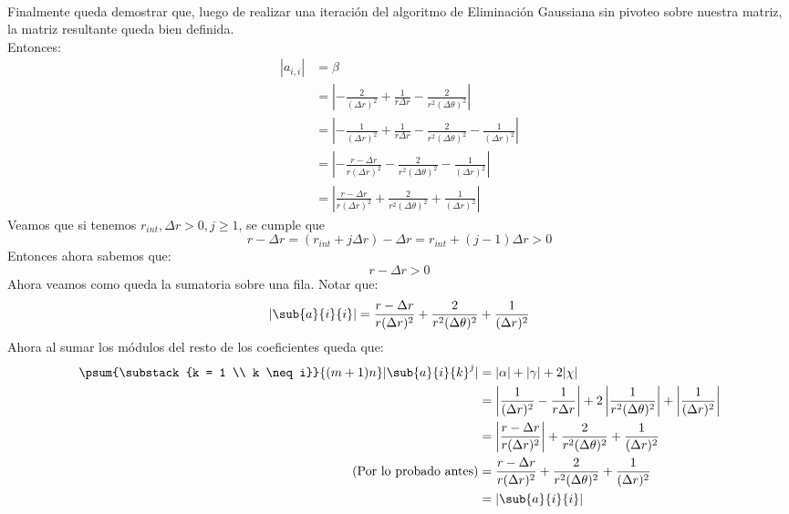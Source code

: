 \documentclass[12pt]{article}
\begin{document}
\paragraph{} Finalmente queda demostrar que, luego de realizar una iteración del algoritmo de Eliminación Gaussiana sin pivoteo sobre nuestra matriz, la matriz resultante queda bien definida. \\ %
Entonces:
\[\begin{split}
  | a_{i,i} | & = \beta \\
              & = \left \vert - \frac{2}{(\Delta r)^2} + \frac{1}{r \Delta r} - \frac{2}{r^2 (\Delta \theta)^2} \right \vert \\
              & = \left \vert - \frac{1}{(\Delta r)^2} + \frac{1}{r \Delta r} - \frac{2}{r^2 (\Delta \theta)^2} - \frac{1}{(\Delta r)^2} \right \vert \\
              & = \left \vert - \frac{r - \Delta r}{r (\Delta r)^2} - \frac{2}{r^2 (\Delta \theta)^2} - \frac{1}{(\Delta r)^2} \right \vert \\
              & = \left \vert \frac{r - \Delta r}{r (\Delta r)^2} + \frac{2}{r^2 (\Delta \theta)^2} + \frac{1}{(\Delta r)^2} \right \vert
\end{split}\]
Veamos que si tenemos \(r_{int}, \Delta r > 0, j \geq 1\), se cumple que
\[
  r - \Delta r = (r_{int} + j \Delta r) - \Delta r = r_{int} + (j - 1) \Delta r > 0
\]
Entonces ahora sabemos que:
\[
  r - \Delta r > 0
\]
Ahora veamos como queda la sumatoria sobre una fila. Notar que:  
\[
  | \sub{a}{i}{i} | = \frac{r - \Delta r}{r (\Delta r)^2} + \frac{2}{r^2 (\Delta \theta)^2} + \frac{1}{(\Delta r)^2}
\]
Ahora al sumar los módulos del resto de los coeficientes queda que:
\[\begin{split}
  \psum{\substack{k = 1 \\ k \neq i}}{(m+1)n} |\sub{a}{i}{k}^{j}| & = |\alpha| + |\gamma| + 2 |\chi| \\
                                                                  & = \left \vert \frac{1}{(\Delta r)^2} - \frac{1}{r \Delta r} \right \vert + 2 \left \vert \frac{1}{r^2 (\Delta \theta)^2} \right \vert + \left \vert \frac{1}{(\Delta r)^2} \right \vert \\
                                                                       & = \left \vert \frac{r - \Delta r}{r (\Delta r)^2} \right \vert + \frac{2}{r^2 (\Delta \theta)^2} + \frac{1}{(\Delta r)^2} \\
                                                                       \text{(Por lo probado antes)}
                                                                       & = \frac{r - \Delta r}{r (\Delta r)^2} + \frac{2}{r^2 (\Delta \theta)^2} + \frac{1}{(\Delta r)^2} \\
                                                                       & = | \sub{a}{i}{i} |
\end{split}\] %
\end{document}
